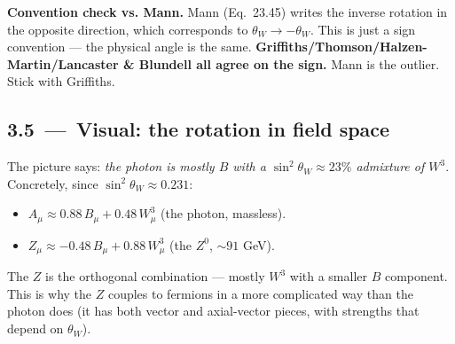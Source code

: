 \documentclass[11pt]{article}
\begin{document}
\begin{warnbox}
\textbf{Convention check vs. Mann.} Mann (Eq.~23.45) writes the inverse rotation in the
opposite direction, which corresponds to $\theta_W \to -\theta_W$. This is just a sign
convention --- the physical angle is the same. \textbf{Griffiths/Thomson/Halzen-Martin/Lancaster
\& Blundell all agree on the sign.} Mann is the outlier. Stick with Griffiths.
\end{warnbox}

\subsection*{3.5 \,---\, Visual: the rotation in field space}

\begin{center}
\end{center}

\begin{intuitionbox}
The picture says: \emph{the photon is mostly $B$ with a $\sin^2\theta_W \approx 23\%$
admixture of $W^3$}. Concretely, since $\sin^2\theta_W \approx 0.231$:
\begin{itemize}[leftmargin=*]
  \item $A_\mu \approx 0.88\, B_\mu + 0.48\, W^3_\mu$ \quad (the photon, massless).
  \item $Z_\mu \approx -0.48\, B_\mu + 0.88\, W^3_\mu$ \quad (the $Z^0$, $\sim 91$ GeV).
\end{itemize}
The $Z$ is the orthogonal combination --- mostly $W^3$ with a smaller $B$ component.
This is why the $Z$ couples to fermions in a more complicated way than the photon does
(it has both vector and axial-vector pieces, with strengths that depend on $\theta_W$).
\end{intuitionbox}
\end{document}
